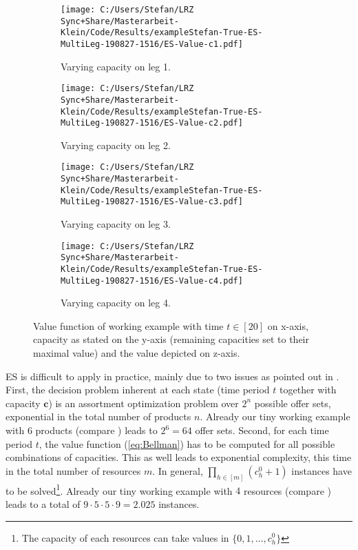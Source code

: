 \begin{figure}[ht]
	\begin{subfigure}[b]{.49\linewidth}
		\centering
		\texttt{[image: C:/Users/Stefan/LRZ Sync+Share/Masterarbeit-Klein/Code/Results/exampleStefan-True-ES-MultiLeg-190827-1516/ES-Value-c1.pdf]}
		\caption{Varying capacity on leg 1.\label{fig-vF1}}
	\end{subfigure}
	\begin{subfigure}[b]{.49\linewidth}
		\centering
		\texttt{[image: C:/Users/Stefan/LRZ Sync+Share/Masterarbeit-Klein/Code/Results/exampleStefan-True-ES-MultiLeg-190827-1516/ES-Value-c2.pdf]}
		\caption{Varying capacity on leg 2.\label{fig-vF2}}
	\end{subfigure}
	\begin{subfigure}[b]{.49\linewidth}
		\centering
		\texttt{[image: C:/Users/Stefan/LRZ Sync+Share/Masterarbeit-Klein/Code/Results/exampleStefan-True-ES-MultiLeg-190827-1516/ES-Value-c3.pdf]}
		\caption{Varying capacity on leg 3.\label{fig-vF3}}
	\end{subfigure}
	\begin{subfigure}[b]{.49\linewidth}
		\centering
		\texttt{[image: C:/Users/Stefan/LRZ Sync+Share/Masterarbeit-Klein/Code/Results/exampleStefan-True-ES-MultiLeg-190827-1516/ES-Value-c4.pdf]}
		\caption{Varying capacity on leg 4.\label{fig-vF4}}
	\end{subfigure}
	\caption[Value function of working example.]{\label{fig-valueFunc}Value function of working example with time $t \in [20]$ on x-axis, capacity as stated on the y-axis (remaining capacities set to their maximal value) and the value depicted on z-axis.}
\end{figure}

ES is difficult to apply in practice, mainly due to two issues as pointed out \eg in \cite{Koch.2017}. First, the decision problem inherent at each state (time period $t$ together with capacity $\boldsymbol{c}$) is an assortment optimization problem over $2^n$ possible offer sets, \ie exponential in the total number of products $n$. Already our tiny working example with $6$ products (compare ) leads to $2^6 = 64$ offer sets.
Second, for each time period $t$, the value function (\ref{eq:Bellman}) has to be computed for all possible combinations of capacities. This as well leads to exponential complexity, this time in the total number of resources $m$. In general, $\prod_{h \in [m]} (c^0_h+1)$ instances have to be solved\footnote{The capacity of each resources can take values in $\{0, 1, \dots, c^0_h\}$}. Already our tiny working example with $4$ resources (compare ) leads to a total of $9\cdot 5\cdot 5\cdot 9 = 2.025$ instances.


